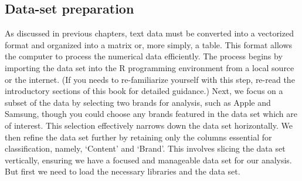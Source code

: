 \subsection{Data-set preparation}\label{dataset-preparation}

As discussed in previous chapters, text data must be converted into a
vectorized format and organized into a matrix or, more simply, a table.
This format allows the computer to process the numerical data
efficiently. The process begins by importing the data set into the R
programming environment from a local source or the internet. (If you
needs to re-familiarize yourself with this step, re-read the introductory sections
of this book for detailed guidance.) Next, we focus on a subset of the
data by selecting two brands for analysis, such as Apple and Samsung,
though you could choose any brands featured in the data set which are
of interest. This selection effectively narrows down the data set
horizontally. We then refine the data set further by retaining only the
columns essential for classification, namely, `Content' and
`Brand'. This involves slicing the data set vertically, ensuring
we have a focused and manageable data set for our analysis. But first we need to load the necessary libraries and the data set.

\begin{Shaded}
\begin{Highlighting}[]
\NormalTok{(} \NormalTok{)}


\OtherTok{\textless{}{-}} \NormalTok{(}\NormalTok{) }\SpecialCharTok{\%\textgreater{}\%}
   \NormalTok{(}\NormalTok{, }\NormalTok{)) }\SpecialCharTok{\%\textgreater{}\%}
\end{Highlighting}
\end{Shaded}

